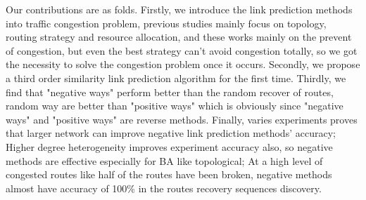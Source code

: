 \documentclass[onecolumn,preprintnumbers,amsmath,amssymb]{revtex4}
\begin{document}
Our contributions are as folds. Firstly, we introduce the link prediction methods into traffic congestion problem, previous studies mainly focus on topology, routing strategy and resource allocation, and these works mainly on the prevent of congestion, but even the best strategy can't avoid congestion totally, so we got the necessity to solve the congestion problem once it occurs. Secondly, we propose a third order similarity link prediction algorithm for the first time. Thirdly, we find that "negative ways" perform better than the random recover of routes, random way are better than "positive ways" which is obviously since "negative ways" and "positive ways" are reverse methods. Finally, varies experiments proves that larger network can improve negative link prediction methods' accuracy; Higher degree heterogeneity improves experiment accuracy also, so negative methods are effective especially for BA like topological; At a high level of congested routes like half of the routes have been broken, negative methods almost have accuracy of 100\% in the routes recovery sequences discovery.








\end{document}
